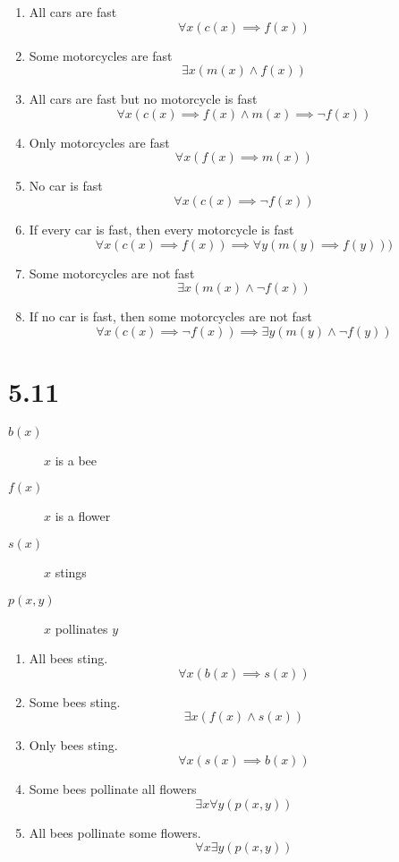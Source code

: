 \documentclass{article}
\begin{document}
\begin{enumerate}[label=\alph*)]
\item 
All cars are fast
\[ \forall x (c(x) \implies f(x)) \]

\item 
Some motorcycles are fast
\[ \exists x(m(x) \land f(x)) \]

\item 
All cars are fast but no motorcycle is fast
\[ \forall x(c(x) \implies f(x) \land m(x) \implies \neg f(x)) \]

\item 
Only motorcycles are fast
\[ \forall x(f(x) \implies m(x)) \]

\item 
No car is fast
\[ \forall x(c(x) \implies \neg f(x)) \]

\item 
If every car is fast, then every motorcycle is fast
\[ \forall x(c(x) \implies f(x)) \implies \forall y(m(y) \implies f(y))  ) \]

\item 
Some motorcycles are not fast
\[ \exists x(m(x) \land \neg f(x)) \]

\item 
If no car is fast, then some motorcycles are not fast
\[ \forall x(c(x) \implies \neg f(x)) \implies \exists y(m(y) \land \neg f(y))\]

\end{enumerate}

\section*{5.11}
\begin{description}
\item[$b(x)$] $x$ is a bee
\item[$f(x)$] $x$ is a flower
\item[$s(x)$] $x$ stings
\item[$p(x, y)$] $x$ pollinates $y$
\end{description}

\begin{enumerate}[label=\alph*)]
\item 
All bees sting.
\[ \forall x (b(x) \implies s(x)) \]

\item 
Some bees sting.
\[ \exists x(f(x) \land s(x)) \]

\item 
Only bees sting.
\[ \forall x(s(x) \implies b(x)) \]

\item 
Some bees pollinate all flowers
\[ \exists x \forall y (p(x, y)) \]

\item 
All bees pollinate some flowers.
\[ \forall x \exists y (p(x, y)) \]
\end{enumerate}
\end{document}
